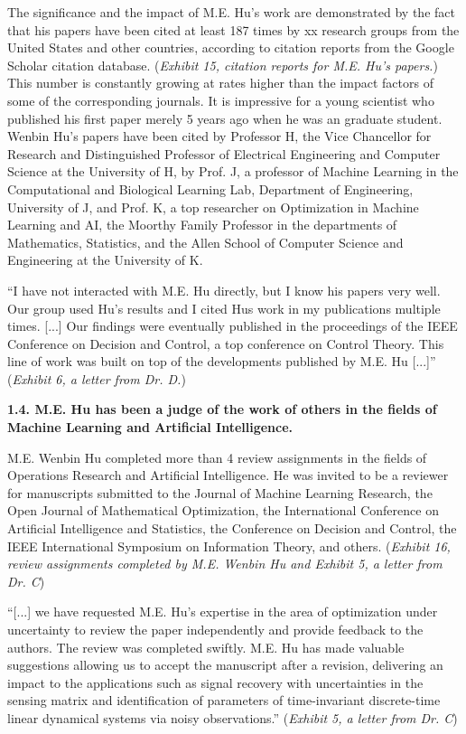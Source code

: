 \documentclass{article}
\begin{document}
The significance and the impact of M.E. Hu’s work are demonstrated by the fact that his papers have been cited at least 187 times by xx  research groups from the United States and other countries, according to citation reports from the Google Scholar citation database. ({\it Exhibit 15, citation reports for M.E. Hu’s papers.}) This number is constantly growing at rates higher than the impact factors of some of the corresponding journals. It is impressive for a young scientist who published his first paper merely 5 years ago when he was an graduate student. Wenbin Hu’s papers have been cited by Professor H, the Vice Chancellor for Research and Distinguished Professor of Electrical Engineering and Computer Science at the University of H, by Prof. J, a professor of Machine Learning in the Computational and Biological Learning Lab, Department of Engineering, University of J, and Prof. K, a top researcher on Optimization in Machine Learning and AI, the Moorthy Family Professor in the departments of Mathematics, Statistics, and the Allen School of Computer Science and Engineering at the University of K.

“I have not interacted with M.E. Hu directly, but I know his papers very well. Our group used Hu's results and I cited Hus work in my publications multiple times.  [...] Our findings were eventually published in the proceedings of the IEEE Conference on Decision and Control, a top conference on Control Theory. This line of work was built on top of the developments published by M.E. Hu [...]” ({\it Exhibit 6, a letter from Dr. D.})


{\bf 1.4. M.E. Hu has been a judge of the work of others in the fields of Machine Learning and Artificial Intelligence. }

M.E. Wenbin Hu completed more than 4 review assignments in the fields of Operations Research and Artificial Intelligence. He was invited to be a reviewer for manuscripts submitted to the Journal of Machine Learning Research, the Open Journal of Mathematical Optimization, the International Conference on Artificial Intelligence and Statistics, the Conference on Decision and Control, the IEEE International Symposium on Information Theory, and others. ({\it Exhibit 16, review assignments completed by M.E. Wenbin Hu and Exhibit 5, a letter from Dr. C})

“[...] we have requested M.E. Hu’s expertise in the area of optimization under uncertainty to review the paper independently and provide feedback to the authors. The review was completed swiftly. M.E. Hu has made valuable suggestions allowing us to accept the manuscript after a revision, delivering an impact to the applications such as signal recovery with uncertainties in the sensing matrix and identification of parameters of time-invariant discrete-time linear dynamical systems via noisy observations.” ({\it Exhibit 5, a letter from Dr. C}) 
\end{document}
